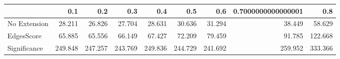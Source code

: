 \begin{tabular}{lrrrrrrrr}
\toprule
{} &     0.1 &     0.2 &     0.3 &     0.4 &     0.5 &     0.6 & 0.7000000000000001 &     0.8 \\
\midrule
No Extension &  28.211 &  26.826 &  27.704 &  28.631 &  30.636 &  31.294 &             38.449 &  58.629 \\
EdgesScore   &  65.885 &  65.556 &  66.149 &  67.427 &  72.209 &  79.459 &             91.785 & 122.668 \\
Significance & 249.848 & 247.257 & 243.769 & 249.836 & 244.729 & 241.692 &            259.952 & 333.366 \\
\bottomrule
\end{tabular}
